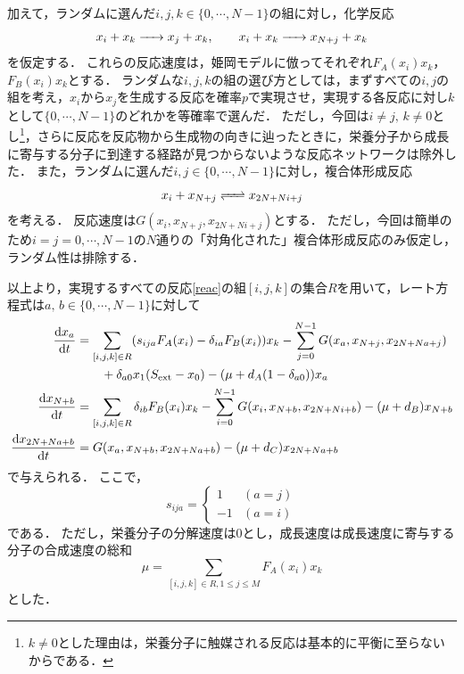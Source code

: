 \documentclass[a4paper,11pt]{jsarticle}
\begin{document}
加えて，ランダムに選んだ$i,j,k\in\{0,\cdots,N-1\}$の組に対し，化学反応
\begin{equation}
  x_i + x_k \ce{->} x_j + x_k,\qquad x_i + x_k \ce{->} x_{N+j} + x_k \label{reac}
\end{equation}
を仮定する．
これらの反応速度は，姫岡モデルに倣ってそれぞれ$F_A(x_i)x_k$，$F_B(x_i)x_k$とする．
ランダムな$i,j,k$の組の選び方としては，まずすべての$i,j$の組を考え，$x_i$から$x_j$を生成する反応を確率$p$で実現させ，実現する各反応に対し$k$として$\{0,\cdots,N-1\}$のどれかを等確率で選んだ．
ただし，今回は$i\neq j,\,k\neq 0$とし\footnote{$k\neq 0$とした理由は，栄養分子に触媒される反応は基本的に平衡に至らないからである．}，さらに反応を反応物から生成物の向きに辿ったときに，栄養分子から成長に寄与する分子に到達する経路が見つからないような反応ネットワークは除外した．
また，ランダムに選んだ$i,j\in\{0,\cdots,N-1\}$に対し，複合体形成反応
\begin{equation}
  x_i + x_{N+j} \ce{<=>} x_{2N+Ni+j}
\end{equation}
を考える．
反応速度は$G(x_i,x_{N+j},x_{2N+Ni+j})$とする．
ただし，今回は簡単のため$i=j=0,\cdots,N-1$の$N$通りの「対角化された」複合体形成反応のみ仮定し，ランダム性は排除する．

以上より，実現するすべての反応\eqref{reac}の組$[i,j,k]$の集合$R$を用いて，レート方程式は$a,\,b\in\{0,\cdots,N-1\}$に対して
\begin{align}
  \dv{x_a}{t} &= \sum_{[i,j,k]\in R} (s_{ija}F_A(x_i)-\delta_{ia}F_B(x_i))x_k
  - \sum_{j=0}^{N-1} G(x_a,x_{N+j},x_{2N+Na+j})\notag\\
  &\qquad +\delta_{a0}x_1(S_{\mathrm{ext}}-x_0)-(\mu + d_A(1-\delta_{a0})) x_a\\
  \dv{x_{N+b}}{t} &= \sum_{[i,j,k]\in R} \delta_{ib}F_B(x_i)x_k - \sum_{i=0}^{N-1} G(x_i,x_{N+b},x_{2N+Ni+b}) -(\mu + d_B) x_{N+b}\\
  \dv{x_{2N+Na+b}}{t} &= G(x_a,x_{N+b},x_{2N+Na+b}) -(\mu + d_C) x_{2N+Na+b}
\end{align}
で与えられる．
ここで，
\begin{equation}
  s_{ija} =
  \begin{cases}
    1 & (a=j)\\
    -1 & (a=i)
  \end{cases}
\end{equation}
である．
ただし，栄養分子の分解速度は0とし，成長速度は成長速度に寄与する分子の合成速度の総和
\begin{equation}
  \mu = \sum_{[i,j,k]\in R, 1\le j\le M} F_A(x_i)x_k
\end{equation}
とした．
\end{document}
